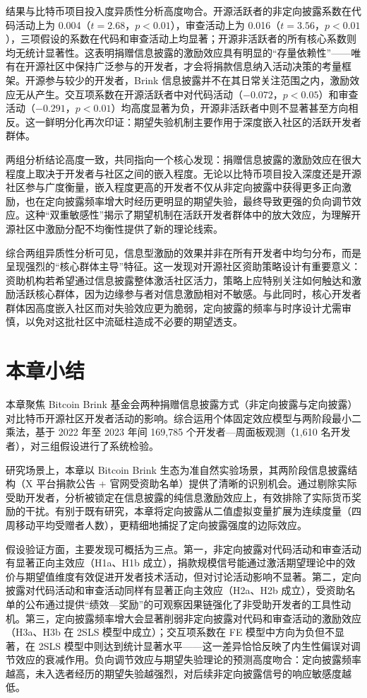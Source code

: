 结果与比特币项目投入度异质性分析高度吻合。开源活跃者的非定向披露系数在代码活动上为 0.004（$t = 2.68$，$p < 0.01$），审查活动上为 0.016（$t = 3.56$，$p < 0.01$），三项假设的系数在代码和审查活动上均显著；开源非活跃者的所有核心系数则均无统计显著性。这表明捐赠信息披露的激励效应具有明显的“存量依赖性”——唯有在开源社区中保持广泛参与的开发者，才会将捐款信息纳入活动决策的考量框架。开源参与较少的开发者，Brink 信息披露并不在其日常关注范围之内，激励效应无从产生。交互项系数在开源活跃者中对代码活动（$-0.072$，$p < 0.05$）和审查活动（$-0.291$，$p < 0.01$）均高度显著为负，开源非活跃者中则不显著甚至方向相反。这一鲜明分化再次印证：期望失验机制主要作用于深度嵌入社区的活跃开发者群体。

两组分析结论高度一致，共同指向一个核心发现：捐赠信息披露的激励效应在很大程度上取决于开发者与社区之间的嵌入程度。无论以比特币项目投入深度还是开源社区参与广度衡量，嵌入程度更高的开发者不仅从非定向披露中获得更多正向激励，也在定向披露频率增大时经历更明显的期望失验，最终导致更强的负向调节效应。这种“双重敏感性”揭示了期望机制在活跃开发者群体中的放大效应，为理解开源社区中激励分配不均衡性提供了新的理论线索。

综合两组异质性分析可见，信息型激励的效果并非在所有开发者中均匀分布，而是呈现强烈的“核心群体主导”特征。这一发现对开源社区资助策略设计有重要意义：资助机构若希望通过信息披露整体激活社区活力，策略上应特别关注如何触达和激励活跃核心群体，因为边缘参与者对信息激励相对不敏感。与此同时，核心开发者群体因高度嵌入社区而对失验效应更为脆弱，定向披露的频率与时序设计尤需审慎，以免对这批社区中流砥柱造成不必要的期望透支。

\section{本章小结}
\label{sec:summary-1}

本章聚焦 Bitcoin Brink 基金会两种捐赠信息披露方式（非定向披露与定向披露）对比特币开源社区开发者活动的影响。综合运用个体固定效应模型与两阶段最小二乘法，基于 2022 年至 2023 年间 169,785 个开发者—周面板观测（1,610 名开发者），对三组假设进行了系统检验。

研究场景上，本章以 Bitcoin Brink 生态为准自然实验场景，其两阶段信息披露结构（X 平台捐款公告 + 官网受资助名单）提供了清晰的识别机会。通过剔除实际受助开发者，分析被锁定在信息披露的纯信息激励效应上，有效排除了实际货币奖励的干扰。有别于既有研究，本章将定向披露从二值虚拟变量扩展为连续度量（四周移动平均受赠者人数），更精细地捕捉了定向披露强度的边际效应。

假设验证方面，主要发现可概括为三点。第一，非定向披露对代码活动和审查活动有显著正向主效应（H1a、H1b 成立），捐款规模信号能通过激活期望理论中的效价与期望值维度有效促进开发者技术活动，但对讨论活动影响不显著。第二，定向披露对代码活动和审查活动同样有显著正向主效应（H2a、H2b 成立），受资助名单的公布通过提供“绩效—奖励”的可观察因果链强化了非受助开发者的工具性动机。第三，定向披露频率增大会显著削弱非定向披露对代码和审查活动的激励效应（H3a、H3b 在 2SLS 模型中成立）；交互项系数在 FE 模型中方向为负但不显著，在 2SLS 模型中则达到统计显著水平——这一差异恰恰反映了内生性偏误对调节效应的衰减作用。负向调节效应与期望失验理论的预测高度吻合：定向披露频率越高，未入选者经历的期望失验越强烈，对后续非定向披露信号的响应敏感度越低。

